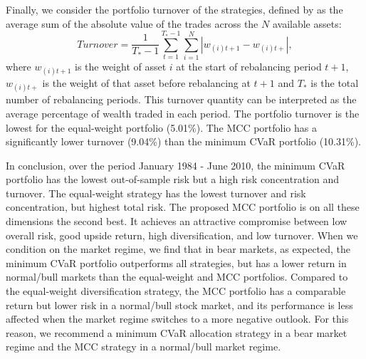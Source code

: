 \documentclass[12pt,a4paper]{article}
\begin{document}

Finally, we consider the portfolio turnover of the strategies, defined by \citet{DeMiguel2009} as the average sum of the absolute value of the trades across the $N$ available assets:
\begin{equation} Turnover = \frac{1}{T_*-1} \sum_{t=1}^{T_*-1} \sum_{i=1}^N | w_{(i)t+1}-w_{(i)t+} |,
\label{eq:turnover} \end{equation}
where $w_{(i)t+1}$ is the weight of asset $i$ at the start of rebalancing period $t+1$, $w_{(i)t+}$ is the weight of that asset before rebalancing at $t+1$ and $T_*$ is the total number of rebalancing periods. This turnover quantity can be interpreted as the average percentage of wealth traded in each period. The portfolio turnover is the lowest for the equal-weight portfolio (5.01\%).  The MCC portfolio has a significantly lower turnover (9.04\%) than the minimum CVaR portfolio (10.31\%).

	In conclusion, over the period January 1984 - June 2010, the minimum CVaR portfolio has the lowest out-of-sample risk but a high risk concentration and turnover. The equal-weight strategy has the lowest turnover and risk concentration, but highest total risk. The proposed MCC portfolio is on all these dimensions the second best. It achieves an attractive compromise between low overall risk, good upside return, high diversification, and low turnover. When we condition on the market regime, we find that in bear markets, as expected, the minimum CVaR portfolio outperforms all strategies, but has a lower return in normal/bull markets than the equal-weight and MCC portfolios. Compared to the equal-weight diversification strategy, the MCC portfolio has a comparable return but lower risk in a normal/bull stock market, and its performance is less affected when the market regime switches to a more negative outlook. For this reason, we recommend a minimum CVaR allocation strategy in a bear market regime and the MCC strategy in a normal/bull market regime.
\end{document}
